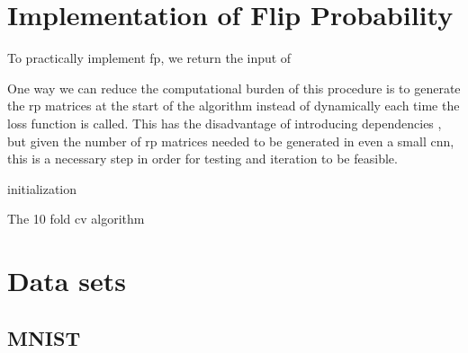 \section{Implementation of Flip Probability}

To practically implement \gls{fp}, we return the input of



One way we can reduce the computational burden of this procedure is to generate the \gls{rp} matrices at the start of the algorithm instead of dynamically each time the loss function is called. This has the disadvantage of introducing dependencies \cite{bob_rp_storage}, but given the number of \gls{rp} matrices needed to be generated in even a small \gls{cnn}, this is a necessary step in order for testing and iteration to be feasible. 
\bigskip

\begin{algorithm}[H]
\SetAlgoLined
{}
 initialization\;
    \caption{The 10 fold \gls{cv} algorithm}
    \label{algo:fp_python_1}
\end{algorithm}

\section{Data sets}
 
%

 \subsection{MNIST}
 
